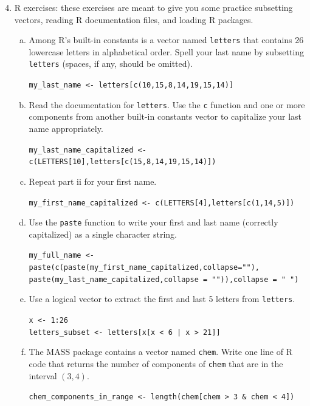\documentclass[letterpaper,12pt,fleqn]{article}
\begin{document}
\newpage

\begin{enumerate}
\setcounter{enumi}{3}

\item R exercises: these exercises are meant to give you some practice subsetting vectors, reading R documentation files, and loading R packages. 

\begin{enumerate}[a)]
\item Among R's built-in constants is a vector named \texttt{letters} that contains 26 lowercase letters in alphabetical order. Spell your last name by subsetting \texttt{letters} (spaces, if any, should be omitted).

\texttt{my\_last\_name <- letters[c(10,15,8,14,19,15,14)]}

\item Read the documentation for \texttt{letters}. Use the \texttt{c} function and one or more components from another built-in constants vector to capitalize your last name appropriately.

\texttt{my\_last\_name\_capitalized <- c(LETTERS[10],letters[c(15,8,14,19,15,14)])}

\item Repeat part ii for your first name.

\texttt{my\_first\_name\_capitalized <- c(LETTERS[4],letters[c(1,14,5)])}

\item Use the \texttt{paste} function to write your first and last name (correctly capitalized) as a single character string.

\texttt{my\_full\_name <- paste(c(paste(my\_first\_name\_capitalized,collapse=""),} \\
\texttt{paste(my\_last\_name\_capitalized,collapse = "")),collapse = " ")}

\item Use a logical vector to extract the first and last 5 letters from \texttt{letters}.

\texttt{x <- 1:26} \\
\texttt{letters\_subset <- letters[x[x < 6 | x > 21]]}

\item The MASS package contains a vector named \texttt{chem}. Write one line of R code that returns the number of components of \texttt{chem} that are in the interval $(3, 4)$.

\texttt{chem\_components\_in\_range <- length(chem[chem > 3 \& chem < 4])}
\end{enumerate}

\end{enumerate}
\end{document}
